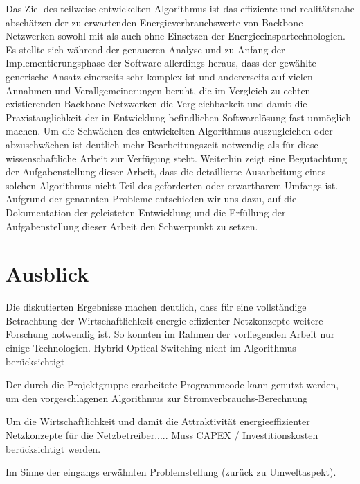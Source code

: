 \documentclass[12pt,titlepage]{article}
\begin{document}
Das Ziel des teilweise entwickelten Algorithmus ist das effiziente und realitätsnahe abschätzen der zu erwartenden Energieverbrauchswerte von Backbone-Netzwerken sowohl mit als auch ohne Einsetzen der Energieeinspartechnologien. Es stellte sich während der genaueren Analyse und zu Anfang der Implementierungsphase der Software allerdings heraus, dass der gewählte generische Ansatz einerseits sehr komplex ist und andererseits auf vielen Annahmen und Verallgemeinerungen beruht, die im Vergleich zu echten existierenden Backbone-Netzwerken die Vergleichbarkeit und damit die Praxistauglichkeit der in Entwicklung befindlichen Softwarelösung fast unmöglich machen. 
Um die Schwächen des entwickelten Algorithmus auszugleichen oder abzuschwächen ist deutlich mehr Bearbeitungszeit notwendig als für diese wissenschaftliche Arbeit zur Verfügung steht.
Weiterhin zeigt eine Begutachtung der Aufgabenstellung dieser Arbeit, dass die detaillierte Ausarbeitung eines solchen Algorithmus nicht Teil des geforderten oder erwartbarem Umfangs ist.
Aufgrund der genannten Probleme entschieden wir uns dazu, auf die Dokumentation der geleisteten Entwicklung und die Erfüllung der Aufgabenstellung dieser Arbeit den Schwerpunkt zu setzen. 


\section{Ausblick}
% 
Die diskutierten Ergebnisse machen deutlich, dass für eine vollständige Betrachtung der Wirtschaftlichkeit energie-effizienter Netzkonzepte weitere Forschung notwendig ist. So konnten im Rahmen der vorliegenden Arbeit nur einige Technologien. Hybrid Optical Switching nicht im Algorithmus berücksichtigt


Der durch die Projektgruppe erarbeitete Programmcode kann genutzt werden, um den vorgeschlagenen Algorithmus zur Stromverbrauchs-Berechnung

Um die Wirtschaftlichkeit und damit die Attraktivität energieeffizienter Netzkonzepte für die Netzbetreiber..... Muss CAPEX / Investitionskosten berücksichtigt werden.

Im Sinne der eingangs erwähnten Problemstellung (zurück zu Umweltaspekt).

\newpage
\printbibliography 
\end{document}
